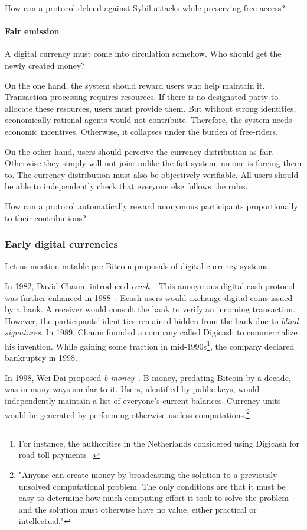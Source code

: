 How can a protocol defend against Sybil attacks while preserving free access?


\paragraph{Fair emission}

A digital currency must come into circulation somehow.
Who should get the newly created money?

On the one hand, the system should reward users who help maintain it.
Transaction processing requires resources.
If there is no designated party to allocate these resources, users must provide them.
But without strong identities, economically rational agents would not contribute.
Therefore, the system needs economic incentives.
Otherwise, it collapses under the burden of free-riders.

On the other hand, users should perceive the currency distribution as fair.
Otherwise they simply will not join: unlike the fiat system, no one is forcing them to.
The currency distribution must also be objectively verifiable.
All users should be able to independently check that everyone else follows the rules.

How can a protocol automatically reward anonymous participants proportionally to their contributions?


\subsubsection*{Early digital currencies}

Let us mention notable pre-Bitcoin proposals of digital currency systems.

In 1982, David Chaum introduced \textit{ecash}~\cite{Chaum1982}.
This anonymous digital cash protocol was further enhanced in 1988~\cite{Chaum1988}.
Ecash users would exchange digital coins issued by a bank.
A receiver would consult the bank to verify an incoming transaction.
However, the participants' identities remained hidden from the bank due to \textit{blind signatures}.
In 1989, Chaum founded a company called Digicash to commercialize his invention.
While gaining some traction in mid-1990s\footnote{For instance, the authorities in the Netherlands considered using Digicash for road toll payments~\cite{Chaum2019}.}, the company declared bankruptcy in 1998.

In 1998, Wei Dai proposed \textit{b-money}~\cite{Dai1998}.
B-money, predating Bitcoin by a decade, was in many ways similar to it.
Users, identified by public keys, would independently maintain a list of everyone's current balances.
Currency units would be generated by performing otherwise useless computations.\footnote{"Anyone can create money by broadcasting the solution to a previously unsolved computational problem. The only conditions are that it must be easy to determine how much computing effort it took to solve the problem and the solution must otherwise have no value, either practical or intellectual."}

